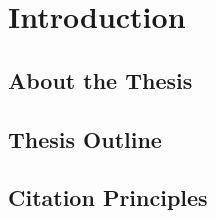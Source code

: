 \chapter{Introduction}
\label{chap:Intro}

\section{About the Thesis}
\section{Thesis Outline}
\section{Citation Principles}
   
